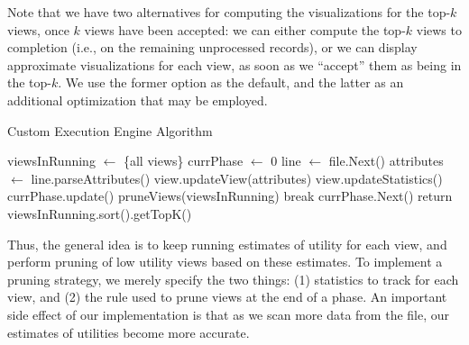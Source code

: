 Note that we have two alternatives for computing the visualizations for the top-$k$
views, once $k$ views have been accepted: 
we can either compute the top-$k$ views to completion (i.e.,
on the remaining unprocessed records),
or we can display approximate visualizations for each view, as soon as we ``accept'' them
as being in the top-$k$. 
We use the former option as the default, 
and the latter as an additional optimization that may be employed.



\begin{algorithm}
\caption{Custom Execution Engine Algorithm}
\label{algo:custom_exec_engine}
\begin{algorithmic}[1]
\State viewsInRunning $\gets$ \{all views\}
\State currPhase $\gets$ 0
\State line $\gets$ file.Next()
\State attributes $\gets$ line.parseAttributes()
\State view.updateView(attributes)
\State view.updateStatistics()
\EndFor
\State currPhase.update()
\State pruneViews(viewsInRunning)
\State break
\EndIf
\State currPhase.Next()
\EndIf
\EndWhile
\State return viewsInRunning.sort().getTopK()
\end{algorithmic}
\end{algorithm}

Thus, the general idea is to keep running estimates of utility for each view, and
perform pruning of low utility views based on these estimates.
To implement a pruning strategy, we merely specify the two things: (1)
statistics to track for each view, and 
(2) the rule used to prune views at the end of a phase.
An important side effect of our implementation is that
as we scan more data from the file, our estimates of utilities become more
accurate.


